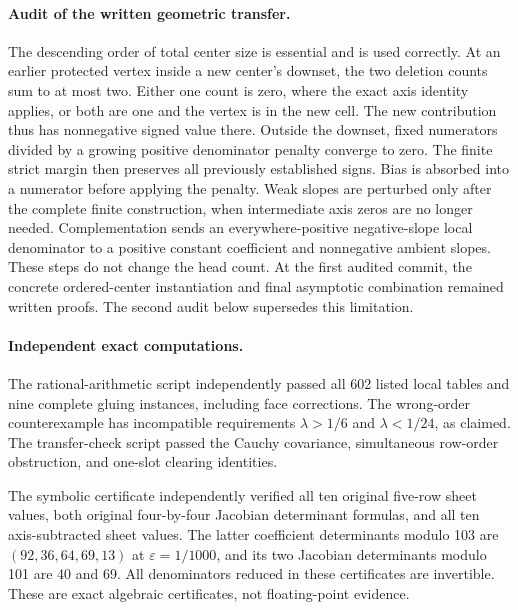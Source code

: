 \documentclass[11pt]{article}
\begin{document}
\paragraph{Audit of the written geometric transfer.}
The descending order of total center size is essential and is used
correctly. At an earlier protected vertex inside a new center's downset,
the two deletion counts sum to at most two. Either one count is zero,
where the exact axis identity applies, or both are one and the vertex
is in the new cell. The new contribution thus has nonnegative signed
value there. Outside the downset, fixed numerators divided by a growing
positive denominator penalty converge to zero. The finite strict margin
then preserves all previously established signs. Bias is absorbed into
a numerator before applying the penalty. Weak slopes are perturbed only
after the complete finite construction, when intermediate axis zeros
are no longer needed. Complementation sends an everywhere-positive
negative-slope local denominator to a positive constant coefficient and
nonnegative ambient slopes. These steps do not change the head count.
At the first audited commit, the concrete ordered-center instantiation
and final asymptotic combination remained written proofs. The second
audit below supersedes this limitation.

\paragraph{Independent exact computations.}
The rational-arithmetic script independently passed all 602 listed local
tables and nine complete gluing instances, including face corrections.
The wrong-order counterexample has incompatible requirements
$\lambda>1/6$ and $\lambda<1/24$, as claimed. The transfer-check script
passed the Cauchy covariance, simultaneous row-order obstruction, and
one-slot clearing identities.

The symbolic certificate independently verified all ten original
five-row sheet values, both original four-by-four Jacobian determinant
formulas, and all ten axis-subtracted sheet values. The latter coefficient
determinants modulo 103 are $(92,36,64,69,13)$ at
$\varepsilon=1/1000$, and its two Jacobian determinants modulo 101 are
40 and 69. All denominators reduced in these certificates are invertible.
These are exact algebraic certificates, not floating-point evidence.
\end{document}

